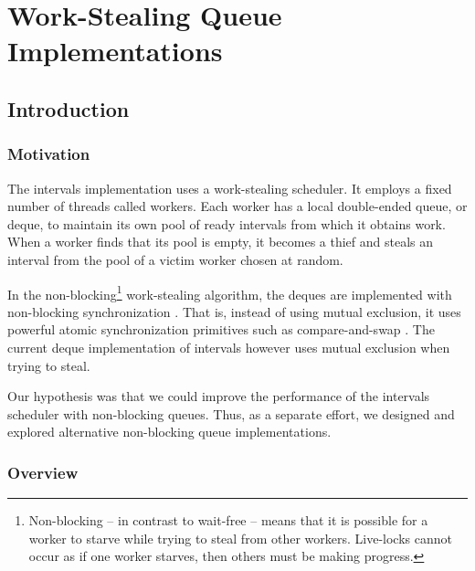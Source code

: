 
\part{Work-Stealing Queue Implementations}
\label{part:queues}

\chapter{Introduction}
\label{chap:queues-introduction}

\section{Motivation}
\label{sec:queues-intro-motivation}

The intervals implementation uses a work-stealing scheduler. It
employs a fixed number of threads called workers. Each worker has a
local double-ended queue, or deque, to maintain its own pool of ready
intervals from which it obtains work. When a worker finds that its
pool is empty, it becomes a thief and steals an interval from the pool
of a victim worker chosen at random.

In the non-blocking\footnote{Non-blocking -- in contrast to wait-free
  \cite{Herlihy1991} -- means that it is possible for a worker to
  starve while trying to steal from other workers. Live-locks cannot
  occur as if one worker starves, then others must be making
  progress.} work-stealing algorithm, the deques are implemented with
non-blocking synchronization \cite{Arora2001}. That is, instead of
using mutual exclusion, it uses powerful atomic synchronization
primitives such as compare-and-swap \cite{Moir1997}. The current deque
implementation of intervals however uses mutual exclusion when trying
to steal.

Our hypothesis was that we could improve the performance of the
intervals scheduler with non-blocking queues. Thus, as a separate
effort, we designed and explored alternative non-blocking queue
implementations.

\section{Overview}
\label{sec:queues-intro-overview}


